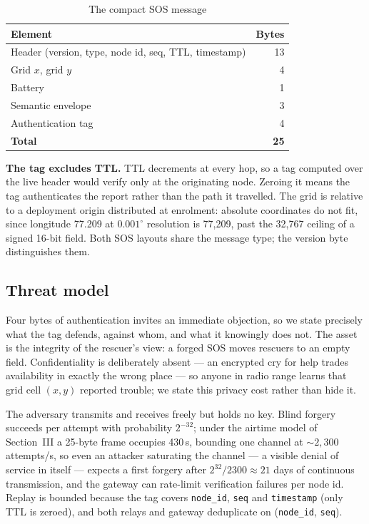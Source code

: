 \documentclass[conference]{IEEEtran}
\begin{document}
\begin{table}[htbp]
\caption{The compact SOS message}
\begin{center}
\begin{tabular}{lr}
\toprule
\textbf{Element} & \textbf{Bytes} \\
\midrule
Header (version, type, node id, seq, TTL, timestamp) & 13 \\
Grid $x$, grid $y$ & 4 \\
Battery & 1 \\
Semantic envelope & 3 \\
Authentication tag & 4 \\
\midrule
\textbf{Total} & \textbf{25} \\
\bottomrule
\end{tabular}
\label{tab:compact}
\end{center}
\end{table}

\textbf{The tag excludes TTL.} TTL decrements at every hop, so a tag computed
over the live header would verify only at the originating node. Zeroing it
means the tag authenticates the report rather than the path it travelled. The
grid is relative to a deployment origin distributed at enrolment: absolute
coordinates do not fit, since longitude 77.209 at $0.001^\circ$ resolution is
77{,}209, past the 32{,}767 ceiling of a signed 16-bit field. Both SOS layouts
share the message type; the version byte distinguishes them.

\subsection{Threat model}
Four bytes of authentication invites an immediate objection, so we state
precisely what the tag defends, against whom, and what it knowingly does not.
The asset is the integrity of the rescuer's view: a forged SOS moves rescuers
to an empty field. Confidentiality is deliberately absent --- an encrypted cry
for help trades availability in exactly the wrong place --- so anyone in radio
range learns that grid cell $(x,y)$ reported trouble; we state this privacy
cost rather than hide it.

The adversary transmits and receives freely but holds no key. Blind forgery
succeeds per attempt with probability $2^{-32}$; under the airtime model of
Section~III a 25-byte frame occupies 430\,\textmu s, bounding one channel at
${\sim}2{,}300$ attempts/s, so even an attacker saturating the channel --- a
visible denial of service in itself --- expects a first forgery after
$2^{32}/2300 \approx 21$ days of continuous transmission, and the gateway can
rate-limit verification failures per node id. Replay is bounded because the
tag covers \texttt{node\_id}, \texttt{seq} and \texttt{timestamp} (only TTL
is zeroed), and both relays and gateway deduplicate on
(\texttt{node\_id}, \texttt{seq}).
\end{document}
